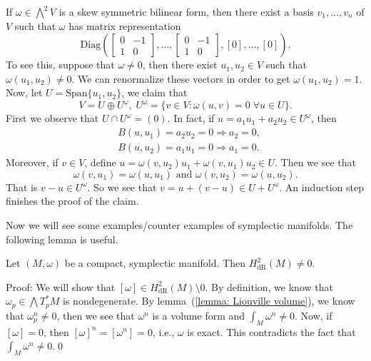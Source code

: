 \begin{remark}
    If $\omega\in\bigwedge^2 V$ is a skew symmetric bilinear form, then there exist a basis $v_1,\dots,v_n$ of $V$ such that 
    $\omega$ has matrix representation 
    \begin{equation}
        \text{Diag}\left(
            \left[\begin{matrix}
            0&-1\\1&0
        \end{matrix}\right],\dots,
        \left[\begin{matrix}
            0&-1\\1&0
        \end{matrix}\right],
        [0],\dots,[0]
        \right).
    \end{equation}
    To see this, suppose that $\omega\neq0$, then there exist $u_1,u_2\in V$ such that $\omega(u_1,u_2)\neq0$. We can renormalize
    these vectors in order to get $\omega(u_1,u_2)=1$. Now, let $U=\text{Span}\{u_1,u_2\}$, we claim that 
    \begin{equation}
        V = U\oplus U^\omega,\;U^\omega=\{v\in V:\omega(u,v)=0\;\forall u\in U\}.
    \end{equation}
    First we observe that $U\cap U^\omega=(0)$. In fact, if $u=a_1u_1+a_2u_2\in U^\omega$, then 
    \begin{equation}
        \begin{aligned}
            &B(u,u_1)=a_2u_2 = 0\Rightarrow a_2=0,\\
            &B(u,u_2)=a_1u_1 = 0\Rightarrow a_1=0.
        \end{aligned}
    \end{equation}
    Moreover, if $v\in V$, define $u=\omega(v,u_2)u_1+\omega(v,u_1)u_2\in U$. Then we see that
    \begin{equation}
        \omega(v,u_1)=\omega(u,u_1)\text{ and }\omega(v,u_2)=\omega(u,u_2).
    \end{equation} 
    That is $v-u\in U^\omega$. So we see that $v=u+(v-u)\in U+U^\omega$. An induction step finishes the proof of the claim.
\end{remark}

Now we will see some examples/counter examples of symplectic manifolds. The following lemma is useful.
\begin{dang}
    \begin{lemma}
        Let $(M,\omega)$ be a compact, symplectic manifold. Then $H_{\text{dR}}^2(M)\neq0$.
    \end{lemma}
\end{dang}
Proof: We will show that $[\omega]\in H_{\text{dR}}^2(M)\setminus0$. By definition, we know that 
$\omega_p\in\bigwedge T_p^*M$ is nondegenerate. By lemma~(\ref{lemma: Liouville volume}), we know that 
$\omega_p^n\neq0$, then we see that $\omega^n$ is a volume form and $\int_M\omega^n\neq0$. Now, if 
$[\omega]=0$, then $[\omega]^n=[\omega^n]=0$, i.e., $\omega$ is exact. This contradicts the fact that 
$\int_M\omega^n\neq0$.\qed

